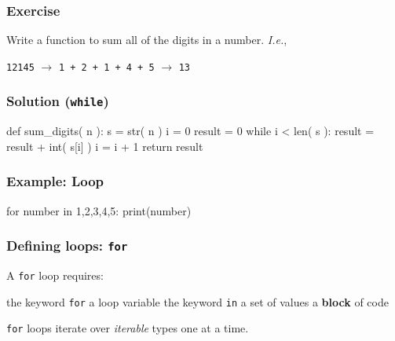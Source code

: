 \documentclass[11pt]{beamer}
\begin{document}
\begin{frame}[fragile]
  \frametitle{Exercise}
  \Enlarge

  Write a function to sum all of the digits in a number.  \pause \emph{I.e.},

  \begin{center}
  \texttt{12145} $\rightarrow$ \texttt{1 + 2 + 1 + 4 + 5} $\rightarrow$ \texttt{13}
  \end{center}
\end{frame}

\begin{frame}[fragile]
  \frametitle{Solution (\texttt{while})}
  \Enlarge

  \begin{semiverbatim}
def sum_digits( n ):
    s = str( n )
    i = 0
    result = 0
    while i < len( s ):
        result = result + int( s[i] )
        i = i + 1
    return result
  \end{semiverbatim}
\end{frame}

\begin{frame}[fragile]
  \frametitle{Example:  Loop}
  \Enlarge

  \begin{semiverbatim}
for number in 1,2,3,4,5:
    print(number)
  \end{semiverbatim}
\end{frame}

\begin{frame}[fragile]
  \frametitle{Defining loops:  \texttt{for}}
  \Enlarge

  \begin{itemize}
  \myitem  A \texttt{for} loop requires:
    \begin{itemize}
    \mysubitem  the keyword \texttt{for}
    \mysubitem  a loop variable
    \mysubitem  the keyword \texttt{in}
    \mysubitem  a set of values
    \mysubitem  a \textbf{block} of code
    \end{itemize}
  \myitem  \texttt{for} loops iterate over \emph{iterable} types one at a time.
  \end{itemize}
\end{frame}
\end{document}
